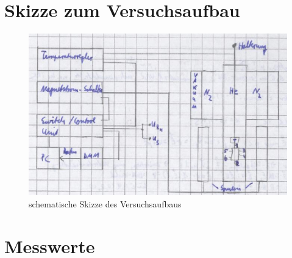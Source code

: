 \newpage

\onecolumn

\appendix

\section{Skizze zum Versuchsaufbau}
\label{sec:aufbau}
\begin{figure}[htb]
   \centering
   \includegraphics[width=1\columnwidth,keepaspectratio]{aufbau}
   \caption{schematische Skizze des Versuchsaufbaus}
\end{figure}

\section{Messwerte}
\label{sec:messwerte}

